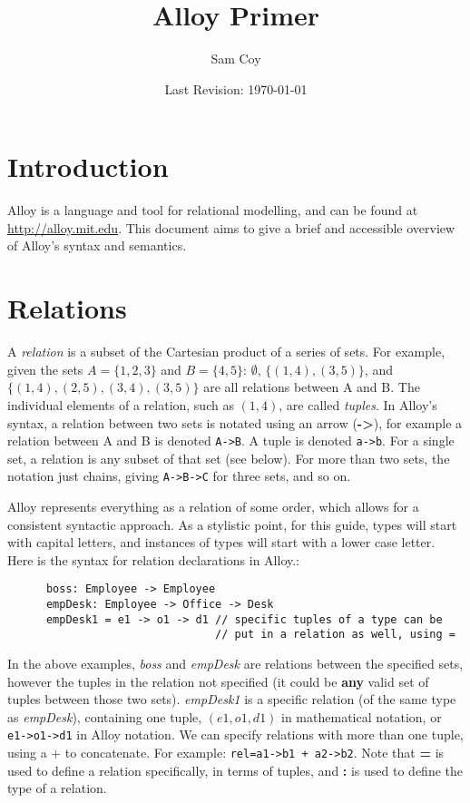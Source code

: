 \documentclass[10pt]{article}
\title{Alloy Primer}
\author{Sam Coy}
\date{Last Revision: \today}
\begin{document}
\maketitle

  \section*{Introduction}
    Alloy is a language and tool for relational modelling, and can be found at \url{http://alloy.mit.edu}. This document aims to give a brief and accessible overview of Alloy's syntax and semantics.

  \section*{Relations}
    A \textit{relation} is a subset of the Cartesian product of a series of sets. For example, given the sets $A=\{1, 2, 3\}$ and $B=\{4, 5\}$: $\emptyset$, $\{(1,4), (3, 5)\}$, and $\{(1,4), (2,5), (3,4), (3,5)\}$ are all relations between A and B. The individual elements of a relation, such as $(1,4)$, are called \textit{tuples}. In Alloy's syntax, a relation between two sets is notated using an arrow (\textbf{-\textgreater}), for example a relation between A and B is denoted \lstinline|A->B|. A tuple is denoted \lstinline|a->b|. For a single set, a relation is any subset of that set (see below). For more than two sets, the notation just chains, giving \lstinline|A->B->C| for three sets, and so on.\par
    Alloy represents everything as a relation of some order, which allows for a consistent syntactic approach. As a stylistic point, for this guide, types will start with capital letters, and instances of types will start with a lower case letter. Here is the syntax for relation declarations in Alloy.:
    \begin{verbatim}
      boss: Employee -> Employee
      empDesk: Employee -> Office -> Desk
      empDesk1 = e1 -> o1 -> d1 // specific tuples of a type can be
                                // put in a relation as well, using =
    \end{verbatim}
    In the above examples, \textit{boss} and \textit{empDesk} are relations between the specified sets, however the tuples in the relation not specified (it could be \textbf{any} valid set of tuples between those two sets). \textit{empDesk1} is a specific relation (of the same type as \textit{empDesk}), containing one tuple, $(e1, o1, d1)$ in mathematical notation, or \lstinline|e1->o1->d1| in Alloy notation. We can specify relations with more than one tuple, using a + to concatenate. For example: \lstinline|rel=a1->b1 + a2->b2|. Note that \textbf{=} is used to define a relation specifically, in terms of tuples, and \textbf{:} is used to define the type of a relation.\par
\end{document}
